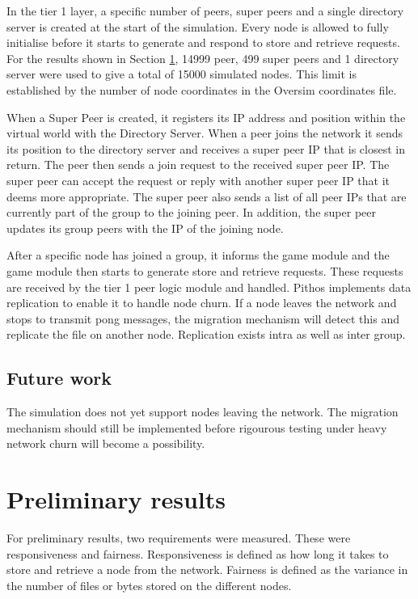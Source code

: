 \documentclass[10pt,a4paper,conference]{IEEEtran}
\begin{document}
In the tier 1 layer, a specific number of peers, super peers and a single directory server is created at the start of the simulation. Every node is
allowed to fully initialise before it starts to generate and respond to store and retrieve requests. For the results shown in Section \ref{results},
14999 peer, 499 super peers and 1 directory server were used to give a total of 15000 simulated nodes. This limit is established by the number of
node coordinates in the Oversim coordinates file.

When a Super Peer is created, it registers its IP address and position within the virtual world with the Directory Server. When a peer joins the
network it sends its position to the directory server and receives a super peer IP that is closest in return. The peer then sends a join request to
the received super peer IP. The super peer can accept the request or reply with another super peer IP that it deems more appropriate. The super peer
also sends a list of all peer IPs that are currently part of the group to the joining peer. In addition, the super peer updates its group peers with
the IP of the joining node.

After a specific node has joined a group, it informs the game module and the game module then starts to generate store and retrieve requests. These
requests are received by the tier 1 peer logic module and handled. Pithos implements data replication to enable it to handle node churn. If a node
leaves the network and stops to transmit pong messages, the migration mechanism will detect this and replicate the file on another node. Replication
exists intra as well as inter group.

\subsection{Future work}

The simulation does not yet support nodes leaving the network. The migration mechanism should still be implemented before rigourous testing under
heavy network churn will become a possibility.



\section{Preliminary results}
\label{results}

For preliminary results, two requirements were measured. These were responsiveness and fairness. Responsiveness is defined as how long it takes to
store and retrieve a node from the network. Fairness is defined as the variance in the number of files or bytes stored on the different nodes.
\end{document}
